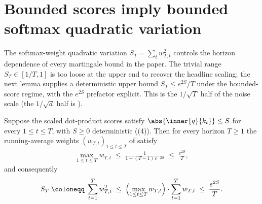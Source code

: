 \section{Bounded scores imply bounded softmax quadratic variation}
\label{sec:quad_variation}

The softmax-weight quadratic variation $S_T=\sum_t w_{T,t}^2$ controls
the horizon dependence of every martingale bound in the paper. The
trivial range $S_T\in[1/T,1]$ is too loose at the upper end to recover
the headline scaling; the next lemma supplies a deterministic upper bound
$S_T\le e^{2S}/T$ under the bounded-score regime, with the $e^{2S}$
prefactor explicit. This is the $1/\sqrt T$ half of the noise scale (the
$1/\sqrt d$ half is ).

\begin{lemma}
\label{lem:quad_variation}
Suppose the scaled dot-product scores satisfy $\abs{\inner{q}{k_t}}\le S$
for every $1\le t\le T$, with $S\ge0$ deterministic
((4)). Then for every horizon $T\ge1$ the
running-average weights $(w_{T,t})_{1\le t\le T}$ of
 satisfy
\begin{align}\label{eq:max_weight}
   \max_{1\le t\le T} w_{T,t}
   \;\le\;
   \frac{1}{1+(T-1)\,e^{-2S}}
   \;\le\;
   \frac{e^{2S}}{T},
\end{align}
and consequently
\begin{align}\label{eq:ST_bound}
   S_T \;\coloneqq\; \sum_{t=1}^{T} w_{T,t}^2
   \;\le\;
   \Bigl(\max_{1\le t\le T} w_{T,t}\Bigr)\cdot\sum_{t=1}^{T} w_{T,t}
   \;\le\;
   \frac{e^{2S}}{T}.
\end{align}
\end{lemma}

